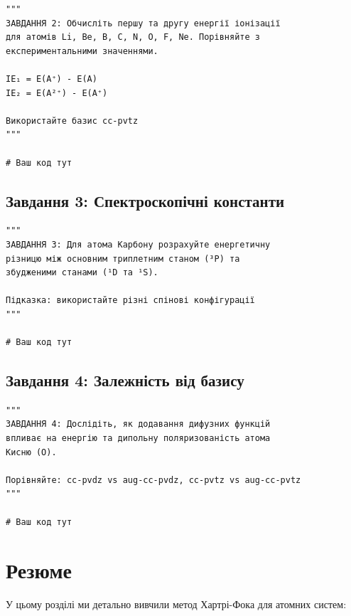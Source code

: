 \begin{verbatim}
"""
ЗАВДАННЯ 2: Обчисліть першу та другу енергії іонізації
для атомів Li, Be, B, C, N, O, F, Ne. Порівняйте з
експериментальними значеннями.

IE₁ = E(A⁺) - E(A)
IE₂ = E(A²⁺) - E(A⁺)

Використайте базис cc-pvtz
"""

# Ваш код тут
\end{verbatim}


\subsection{Завдання 3: Спектроскопічні константи}

\begin{verbatim}
"""
ЗАВДАННЯ 3: Для атома Карбону розрахуйте енергетичну
різницю між основним триплетним станом (³P) та
збудженими станами (¹D та ¹S).

Підказка: використайте різні спінові конфігурації
"""

# Ваш код тут
\end{verbatim}

\subsection{Завдання 4: Залежність від базису}

\begin{verbatim}
"""
ЗАВДАННЯ 4: Дослідіть, як додавання дифузних функцій
впливає на енергію та дипольну поляризованість атома
Кисню (O).

Порівняйте: cc-pvdz vs aug-cc-pvdz, cc-pvtz vs aug-cc-pvtz
"""

# Ваш код тут
\end{verbatim}

\section{Резюме}

У цьому розділі ми детально вивчили метод Хартрі-Фока для атомних систем:

